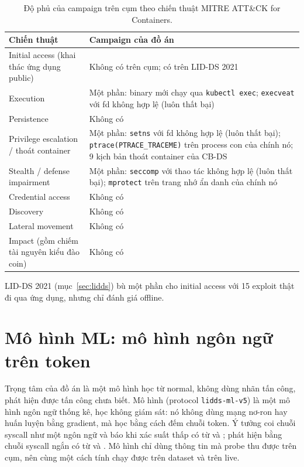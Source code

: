 \begin{longtable}[]{@{}>{\raggedright\arraybackslash}p{}>{\raggedright\arraybackslash}p{}@{}}
\caption{Độ phủ của campaign trên cụm theo chiến thuật MITRE ATT\&CK for Containers.}\label{tab:attack-coverage}\\
\toprule\noalign{}
Chiến thuật & Campaign của đồ án \\
\midrule\noalign{}
\endhead
\bottomrule\noalign{}
\endlastfoot
Initial access (khai thác ứng dụng public) & Không có trên cụm; có trên LID-DS 2021 \\
Execution & Một phần: binary mới chạy qua \texttt{kubectl exec}; \texttt{execveat} với fd không hợp lệ (luôn thất bại) \\
Persistence & Không có \\
Privilege escalation / thoát container & Một phần: \texttt{setns} với fd không hợp lệ (luôn thất bại); \texttt{ptrace(PTRACE\_TRACEME)} trên process con của chính nó; 9 kịch bản thoát container của CB-DS \\
Stealth / defense impairment & Một phần: \texttt{seccomp} với thao tác không hợp lệ (luôn thất bại); \texttt{mprotect} trên trang nhớ ẩn danh của chính nó \\
Credential access & Không có \\
Discovery & Không có \\
Lateral movement & Không có \\
Impact (gồm chiếm tài nguyên kiểu đào coin) & Không có \\
\end{longtable}

LID-DS 2021 (mục~\ref{sec:lidds}) bù một phần cho initial access với 15 exploit thật đi qua ứng dụng, nhưng chỉ đánh giá offline.

\section{Mô hình ML: mô hình ngôn ngữ trên token}\label{sec:token-model}

Trọng tâm của đồ án là một mô hình học từ normal, không dùng nhãn tấn công, phát hiện được tấn công chưa biết. Mô hình (protocol \texttt{lidds-\allowbreak{}ml-\allowbreak{}v5}) là một mô hình ngôn ngữ thống kê, học không giám sát: nó không dùng mạng nơ-ron hay huấn luyện bằng gradient, mà học bằng cách đếm chuỗi token. Ý tưởng coi chuỗi syscall như một ngôn ngữ và báo khi xác suất thấp có từ \citet{kim2016} và \citet{fournier2023}; phát hiện bằng chuỗi syscall ngắn có từ \citet{forrest1996} và \citet{warrender1999}. Mô hình chỉ dùng thông tin mà probe thu được trên cụm, nên cùng một cách tính chạy được trên dataset và trên live.

